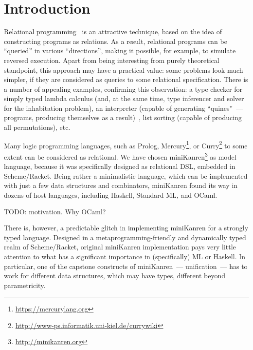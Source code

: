 \section{Introduction}
\label{intro}

Relational programming~\cite{TRS} is an attractive technique, based on the idea 
of constructing programs as relations.  As a result, relational programs can be
``queried'' in various ``directions'', making it possible, for example, to simulate
reversed execution. Apart from being interesting from purely theoretical standpoint, 
this approach may have a practical value: some problems look much simpler, 
if they are considered as queries to some relational specification. There is a 
number of appealing examples, confirming this observation: a type checker 
for simply typed lambda calculus (and, at the same time, type inferencer and solver 
for the inhabitation problem), an interpreter (capable of generating ``quines''~--- 
programs, producing themselves as a result)~\cite{Untagged}, list sorting (capable of 
producing all permutations), etc. 

Many logic programming languages, such as Prolog, Mercury\footnote{\url{https://mercurylang.org}}, 
or Curry\footnote{\url{http://www-ps.informatik.uni-kiel.de/currywiki}} to some extent
can be considered as relational. We have chosen miniKanren\footnote{\url{http://minikanren.org}} 
as model language, because it was specifically designed as relational DSL, embedded in Scheme/Racket. 
Being rather a minimalistic language, which can be implemented with just a few data structures and
combinators, miniKanren found its way in dozens of host languages, including Haskell, 
Standard ML, and OCaml.

TODO: motivation. Why OCaml?

There is, however, a predictable glitch in implementing miniKanren for a strongly typed language. 
Designed in a metaprogramming-friendly and dynamically typed realm of Scheme/Racket, original 
miniKanren implementation pays very little attention to what has a significant importance in (specifically) 
ML or Haskell. In particular, one of the capstone constructs of miniKanren~--- unification~--- has to work for 
different data structures, which may have types, different beyond parametricity.

